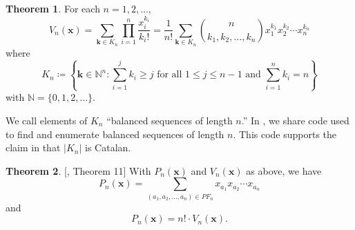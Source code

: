 \documentclass{amsart}
\theoremstyle{definition}
\newtheorem{theorem}{Theorem}[section]
\numberwithin{equation}{section}
\begin{document}
\begin{theorem}\label{thm:volume_formula} \cite[Theorem 1]{bib:PitmanStanley}
    For each $n = 1, 2, \hdots$,
    \begin{equation}\label{eq:poly_vol_fmla}
    V_n(\mathbf{x}) = \sum_{\mathbf{k} \in K_n} \prod_{i=1}^n \frac{x_i^{k_i}}{k_i!} = \frac{1}{n!} \sum_{\mathbf{k} \in K_n} {\binom{n}{k_1, k_2, \hdots, k_n}} x_1^{k_1}x_2^{k_2} \cdots x_n^{k_n}
    \end{equation}
    where 
    \begin{equation}\label{def:the_set_K_n}
        K_n \coloneqq \left\{ \mathbf{k} \in \mathbb{N}^n : \sum_{i=1}^j k_i \geq j \text{ for all } 1 \leq j \leq n-1 \text{ and } \sum_{i=1}^n k_i = n \right\}
    \end{equation}
    with $\mathbb{N} = \{0, 1, 2, \hdots\}$.
\end{theorem}
We call elements of $K_n$ ``balanced sequences of length $n$.''
In , we share code used to find and enumerate balanced sequences of length $n$.
This code supports the claim in \cite{bib:PitmanStanley} that $|K_n|$ is Catalan.


\begin{theorem}\label{thm:ps_vol+prkgfns}[\cite{bib:PitmanStanley}, Theorem 11]
    With $P_n(\mathbf{x})$ and $V_n(\mathbf{x})$ as above, we have
    \begin{equation}\label{eq:PS_pf+vol_xpkgfn}
    P_n(\mathbf{x}) 
    =
    \sum_{(a_1, a_2, \hdots, a_n) \in PF_n} x_{a_1}x_{a_2}\cdots x_{a_n} 
    \end{equation}
    and
    \begin{equation}\label{eq:PS_pf+vol_polytope}
    P_n(\mathbf{x}) 
    = 
    n! \cdot V_n(\mathbf{x}).
    \end{equation}
\end{theorem}
\end{document}
